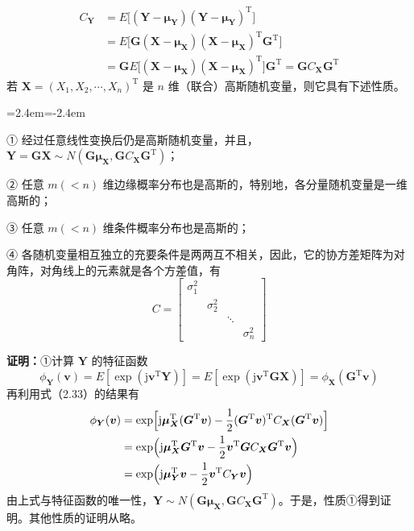 \documentclass[11pt,openany,UTF8]{ctexbook}
\newcommand{\ju}{\mathrm{j}}                       %
\newcommand{\bX}{\bm{X}}
\newenvironment{citemize}
  {\begin{list}{}{\leftmargin=2.4em\itemindent=-2.4em\itemsep=1pt\topsep=3pt\parsep=0pt}}
  {\end{list}}
\begin{document}
\begin{equation}
\begin{aligned}
C_{\bm{Y}}&=E\bigl[(\bm{Y}-\bm{\mu}_{\bm{Y}})(\bm{Y}-\bm{\mu}_{\bm{Y}})^{\mathrm{T}}\bigr]\\
&=E\bigl[\bm{G}(\bX-\bm{\mu}_{\bX})(\bX-\bm{\mu}_{\bX})^{\mathrm{T}}\bm{G}^{\mathrm{T}}\bigr]\\
&=\bm{G}E\bigl[(\bX-\bm{\mu}_{\bX})(\bX-\bm{\mu}_{\bX})^{\mathrm{T}}\bigr]\bm{G}^{\mathrm{T}}
=\bm{G}C_{\bX}\bm{G}^{\mathrm{T}}
\end{aligned}
\label{eq:2.37}
\end{equation}
若 $\bX=(X_1,X_2,\cdots,X_n)^{\mathrm{T}}$ 是 $n$ 维（联合\nobreak）高斯随机变量\nobreak，则它具有下述性质\nobreak。

\begin{sloppypar}
\begin{citemize}
\item ① 经过任意线性变换后仍是高斯随机变量\nobreak，并且\nobreak，
$\bm{Y}=\bm{G}\bX\sim N(\bm{G}\bm{\mu}_{\bX},\bm{G}C_{\bX}\bm{G}^{\mathrm{T}})$\nobreak；
\item ② 任意 $m(<n)$ 维边缘概率分布也是高斯的\nobreak，特别地\nobreak，各分量随机变量是一维高斯的\nobreak；
\item ③ 任意 $m(<n)$ 维条件概率分布也是高斯的\nobreak；
\item ④ 各随机变量相互独立的充要条件是两两互不相关\nobreak，因此\nobreak，它的协方差矩阵为对角阵\nobreak，对角线上的元素就是各个方差值\nobreak，有
\[
C=\begin{bmatrix}
\sigma_1^2 &        &        &        \\
           & \sigma_2^2 &   &   \\
           &        & \ddots &        \\
           &        &        & \sigma_n^2
\end{bmatrix}
\]
\end{citemize}
\end{sloppypar}

\textbf{证明\nobreak：}①计算 $\bm{Y}$ 的特征函数
\[
\phi_{\bm{Y}}(\bm{v})=E[\exp(\ju\bm{v}^{\mathrm{T}}\bm{Y})]
=E[\exp(\ju\bm{v}^{\mathrm{T}}\bm{G}\bX)]
=\phi_{\bX}(\bm{G}^{\mathrm{T}}\bm{v})
\]
再利用式\nobreak（2.33\nobreak）的结果有
\[
\begin{aligned}
\phi_{\bm{Y}}(\bm{v})&=\exp\Bigl[\ju\bm{\mu}_{\bX}^{\mathrm{T}}(\bm{G}^{\mathrm{T}}\bm{v})
 -\frac{1}{2}(\bm{G}^{\mathrm{T}}\bm{v})^{\mathrm{T}}C_{\bX}(\bm{G}^{\mathrm{T}}\bm{v})\Bigr]\\
&=\exp\Bigl(\ju\bm{\mu}_{\bX}^{\mathrm{T}}\bm{G}^{\mathrm{T}}\bm{v}
 -\frac{1}{2}\bm{v}^{\mathrm{T}}\bm{G}C_{\bX}\bm{G}^{\mathrm{T}}\bm{v}\Bigr)\\
&=\exp\Bigl(\ju\bm{\mu}_{\bm{Y}}^{\mathrm{T}}\bm{v}-\frac{1}{2}\bm{v}^{\mathrm{T}}C_{\bm{Y}}\bm{v}\Bigr)
\end{aligned}
\]
由上式与特征函数的唯一性\nobreak，$\bm{Y}\sim N(\bm{G}\bm{\mu}_{\bX},\bm{G}C_{\bX}\bm{G}^{\mathrm{T}})$\nobreak。于是\nobreak，性质①得到证明\nobreak。其他性质的证明从略\nobreak。
\end{document}

